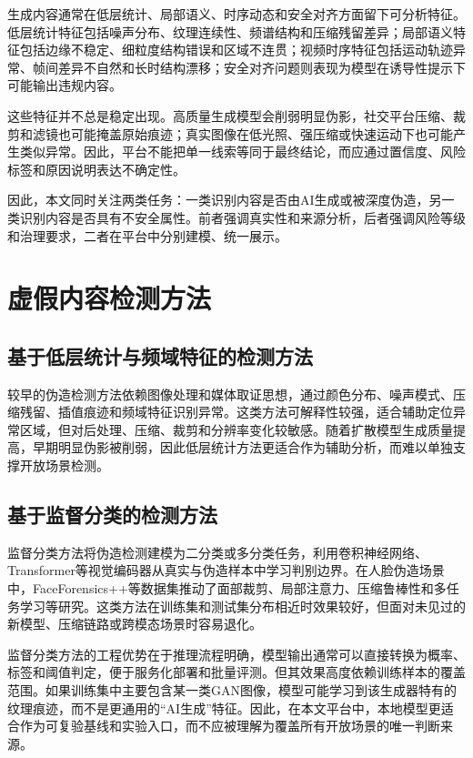 生成内容通常在低层统计、局部语义、时序动态和安全对齐方面留下可分析特征。低层统计特征包括噪声分布、纹理连续性、频谱结构和压缩残留差异；局部语义特征包括边缘不稳定、细粒度结构错误和区域不连贯；视频时序特征包括运动轨迹异常、帧间差异不自然和长时结构漂移；安全对齐问题则表现为模型在诱导性提示下可能输出违规内容。

这些特征并不总是稳定出现。高质量生成模型会削弱明显伪影，社交平台压缩、裁剪和滤镜也可能掩盖原始痕迹；真实图像在低光照、强压缩或快速运动下也可能产生类似异常。因此，平台不能把单一线索等同于最终结论，而应通过置信度、风险标签和原因说明表达不确定性。

因此，本文同时关注两类任务：一类识别内容是否由AI生成或被深度伪造，另一类识别内容是否具有不安全属性。前者强调真实性和来源分析，后者强调风险等级和治理要求，二者在平台中分别建模、统一展示。

\section{虚假内容检测方法}

\subsection{基于低层统计与频域特征的检测方法}

较早的伪造检测方法依赖图像处理和媒体取证思想，通过颜色分布、噪声模式、压缩残留、插值痕迹和频域特征识别异常\cite{ref9,ref15,ref22}。这类方法可解释性较强，适合辅助定位异常区域，但对后处理、压缩、裁剪和分辨率变化较敏感。随着扩散模型生成质量提高，早期明显伪影被削弱，因此低层统计方法更适合作为辅助分析，而难以单独支撑开放场景检测。

\subsection{基于监督分类的检测方法}

监督分类方法将伪造检测建模为二分类或多分类任务，利用卷积神经网络、Transformer等视觉编码器从真实与伪造样本中学习判别边界\cite{ref9,ref11}。在人脸伪造场景中，FaceForensics++等数据集推动了面部裁剪、局部注意力、压缩鲁棒性和多任务学习等研究\cite{ref13}。这类方法在训练集和测试集分布相近时效果较好，但面对未见过的新模型、压缩链路或跨模态场景时容易退化。

监督分类方法的工程优势在于推理流程明确，模型输出通常可以直接转换为概率、标签和阈值判定，便于服务化部署和批量评测。但其效果高度依赖训练样本的覆盖范围。如果训练集中主要包含某一类GAN图像，模型可能学习到该生成器特有的纹理痕迹，而不是更通用的“AI生成”特征。因此，在本文平台中，本地模型更适合作为可复验基线和实验入口，而不应被理解为覆盖所有开放场景的唯一判断来源。

